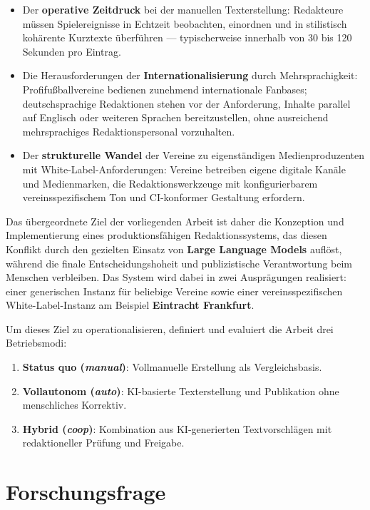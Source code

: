 \documentclass[12pt,a4paper,notitlepage,ngerman]{report}
\begin{document}
\begin{itemize}
    \item Der \textbf{operative Zeitdruck} bei der manuellen Texterstellung: Redakteure müssen Spielereignisse in Echtzeit beobachten, einordnen und in stilistisch kohärente Kurztexte überführen — typischerweise innerhalb von 30 bis 120 Sekunden pro Eintrag.
    
    \item Die Herausforderungen der \textbf{Internationalisierung} durch Mehrsprachigkeit: Profifußballvereine bedienen zunehmend internationale Fanbases; deutschsprachige Redaktionen stehen vor der Anforderung, Inhalte parallel auf Englisch oder weiteren Sprachen bereitzustellen, ohne ausreichend mehrsprachiges Redaktionspersonal vorzuhalten.
    
    \item Der \textbf{strukturelle Wandel} der Vereine zu eigenständigen Medienproduzenten mit White-Label-Anforderungen: Vereine betreiben eigene digitale Kanäle und Medienmarken, die Redaktionswerkzeuge mit konfigurierbarem vereinsspezifischem Ton und CI-konformer Gestaltung erfordern.
\end{itemize}

Das übergeordnete Ziel der vorliegenden Arbeit ist daher die Konzeption und Implementierung eines produktionsfähigen Redaktionssystems, das diesen Konflikt durch den gezielten Einsatz von \textbf{Large Language Models} auflöst, während die finale Entscheidungshoheit und publizistische Verantwortung beim Menschen verbleiben. Das System wird dabei in zwei Ausprägungen realisiert: einer generischen Instanz für beliebige Vereine sowie einer vereinsspezifischen White-Label-Instanz am Beispiel \textbf{Eintracht Frankfurt}.

Um dieses Ziel zu operationalisieren, definiert und evaluiert die Arbeit drei Betriebsmodi:

\begin{enumerate}
    \item \textbf{Status quo (\textit{manual})}: Vollmanuelle Erstellung als Vergleichsbasis.
    \item \textbf{Vollautonom (\textit{auto})}: KI-basierte Texterstellung und Publikation ohne menschliches Korrektiv.
    \item \textbf{Hybrid (\textit{coop})}: Kombination aus KI-generierten Textvorschlägen mit redaktioneller Prüfung und Freigabe.
\end{enumerate}

\section{Forschungsfrage}
\end{document}
